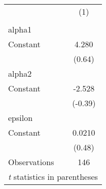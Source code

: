 \begin{tabular}{l*{1}{c}}
\hline\hline
                    &\multicolumn{1}{c}{(1)}\\
                    &\multicolumn{1}{c}{}\\
\hline
alpha1              &            \\
Constant            &       4.280\\
                    &      (0.64)\\
\hline
alpha2              &            \\
Constant            &      -2.528\\
                    &     (-0.39)\\
\hline
epsilon             &            \\
Constant            &      0.0210\\
                    &      (0.48)\\
\hline
Observations        &         146\\
\hline\hline
\multicolumn{2}{l}{\footnotesize \textit{t} statistics in parentheses}\\
\end{tabular}
